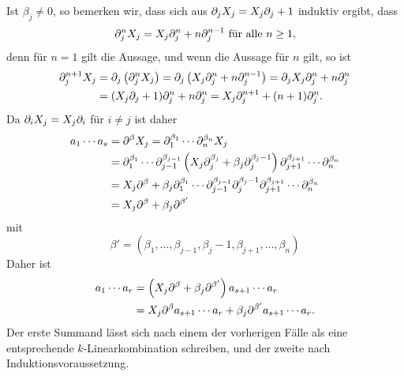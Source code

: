 \documentclass[a4paper,10pt]{article}
\begin{document}
Ist $\beta_j \neq 0$, so bemerken wir, dass sich aus $\partial_j X_j = X_j \partial_j + 1$ induktiv ergibt, dass
\[
 \partial_j^n X_j = X_j \partial_j^n + n \partial_j^{n-1} \text{ für alle } n \geq 1,
\]
denn für $n=1$ gilt die Aussage, und wenn die Aussage für $n$ gilt, so ist
\begin{align*}
 \partial_j^{n+1} X_j
 &= \partial_j \left(\partial_j^n X_j\right)
 = \partial_j \left(X_j\partial_j^n + n\partial_j^{n-1}\right)
 = \partial_j X_j \partial_j^n + n \partial_j^n \\
 &= (X_j \partial_j + 1) \partial_j^n + n \partial_j^n
 = X_j \partial_j^{n+1} + (n+1)\partial_j^n.
\end{align*}
Da $\partial_i X_j = X_j \partial_i$ für $i \neq j$ ist daher
\begin{align*}
 a_1 \cdots a_s
 =&\; \partial^\beta X_j
 =    \partial_1^{\beta_1} \cdots \partial_n^{\beta_n} X_j \\
 =&\; \partial_1^{\beta_1} \cdots \partial_{j-1}^{\beta_{j-1}} \left( X_j \partial_j^{\beta_j} + \beta_j \partial_j^{\beta_j-1}\right) \partial_{j+1}^{\beta_{j+1}} \cdots \partial_n^{\beta_n} \\
 =&\; X_j \partial^\beta + \beta_j \partial_1^{\beta_1} \cdots \partial_{j-1}^{\beta_{j-1}} \partial_{j}^{\beta_j-1} \partial_{j+1}^{\beta_{j+1}} \cdots \partial_n^{\beta_n} \\
 =&\; X_j \partial^\beta + \beta_j \partial^{\beta'}
\end{align*}
mit
\[
 \beta' = (\beta_1, \ldots, \beta_{j-1}, \beta_j-1, \beta_{j+1}, \ldots, \beta_n)
\]
Daher ist
\begin{align*}
 a_1 \cdots a_r
 &= \left( X_j \partial^\beta + \beta_j \partial^{\beta'} \right) a_{s+1} \cdots a_r \\
 &= X_j \partial^\beta a_{s+1} \cdots a_r + \beta_j \partial^{\beta'} a_{s+1} \cdots a_r.
\end{align*}
Der erste Summand lässt sich nach einem der vorherigen Fälle als eine entsprechende $k$-Linearkombination schreiben, und der zweite nach Induktionsvoraussetzung.
\end{document}
